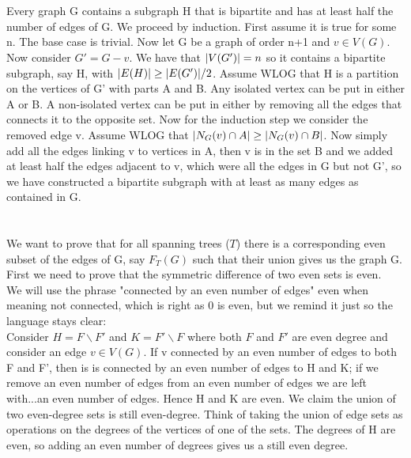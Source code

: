 \documentclass{article}
\DeclarePairedDelimiter{\abs}{\lvert}{\rvert}
\begin{document}
	\clearpage
	
	\section{}
	
	Every graph G contains a subgraph H that is bipartite and has at least half the number of edges of G. We proceed by induction. First assume it is true for some n. The base case is trivial. Now let G be a graph of order n+1 and $v \in V(G)$. Now consider $G' = G-v$. We have that $\abs{V(G')} = n$ so it contains a bipartite subgraph, say H, with $\abs{E(H)}\geq \abs{E(G')}/2$. Assume WLOG that H is a partition on the vertices of G' with parts A and B. Any isolated vertex can be put in either A or B. A non-isolated vertex can be put in either by removing all the edges that connects it to the opposite set. Now for the induction step we consider the removed edge v. Assume WLOG that $\abs{N_G(v) \cap  A} \geq \abs{N_G(v)\cap B}$. Now simply add all the edges linking v to vertices in A, then v is in the set B and we added at least half the edges adjacent to v, which were all the edges in G but not G', so we have constructed a bipartite subgraph with at least as many edges as contained in G. 
	\clearpage
	\section{}
	
	We want to prove that for all spanning trees ($T$) there is a corresponding even subset of the edges of G, say $F_T(G)$ such that their union gives us  the graph G. First we need to prove that the symmetric difference of two even sets is even.\\
	
	We will use the phrase  "connected by an even number of edges" even when meaning not connected, which is right as 0 is even, but we remind it just so the language stays clear:\\
	
	Consider $H = F \backslash F'$ and $K = F'\backslash F$ where both $F$ and $F'$ are even degree and consider an edge $v\in V(G)$. 
	If v connected by an even number of edges to both F and F', then is is connected by an even number of edges to H and K; if we remove an even number of edges from an even number of edges we are left with...an even number of edges. Hence H and K are even. We claim the union of two even-degree sets is still even-degree. Think of taking the union of edge sets as operations on the degrees of the vertices of one of the sets. The degrees of H are even, so adding an even number of degrees gives us a still even degree.\\
	
\end{document}
